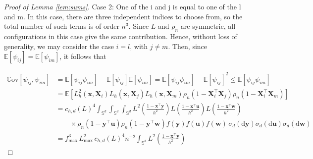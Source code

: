 \documentclass[12pt]{report} %
\newcommand{\bX}{\mathbf{X}}
\newcommand{\bx}{\mathbf{x}}
\newcommand{\by}{\mathbf{y}}
\newcommand{\bw}{\mathbf{w}}
\newcommand{\bu}{\boldsymbol{u}}
\newcommand{\sigmad}{\sigma_{d}}
\newcommand{\Sd}{\mathbb{S}^{d}}
\newcommand{\lc}{\left[}
\newcommand{\rc}{\right]}
\newcommand{\Cov}[2]{\mathbb{C}\mathrm{ov}\lc #1,#2\rc}
\begin{document}
\begin{proof}[Proof of Lemma \ref{lem:sums}]
Case 2: One of the i and j is equal to one of the l and m. In this case, there are three independent indices to choose from, so the total number of such terms is of order $n^3$. Since $L$ and $\rho_n$ are symmetric, all configurations in this case give the same contribution. Hence, without loss of generality, we may consider the case $i=l$, with $j\neq m$. Then, since $\mathbb{E}[\psi_{ij}] = \mathbb{E}[\psi_{im}]$, it follows that

\begin{align}
\Cov{\psi_{ij}}{\psi_{im}}
&= \mathbb{E}\!\left[\psi_{ij}\psi_{im}\right]
   - \mathbb{E}\!\left[\psi_{ij}\right]
     \mathbb{E}\!\left[\psi_{im}\right] 
= \mathbb{E}\!\left[\psi_{ij}\psi_{im}\right]
   - \mathbb{E}\!\left[\psi_{ij}\right]^2 
\leq \mathbb{E}\!\left[\psi_{ij}\psi_{im}\right] \nonumber \\
&= \mathbb{E}\!\left[
    L_h^2(\bx, \bX_i)
    L_h(\bx, \bX_j)
    L_h(\bx, \bX_m)
    \rho_n(1 - \bX_i^\top \bX_j)
    \rho_n(1 - \bX_i^\top \bX_m)
  \right] \nonumber \\
&= c_{h,d}(L)^4
  \int_{\Sd} \int_{\Sd} \int_{\Sd}
    L^2\!\left(\frac{1 - \bx^\top \by}{h^2}\right)
    L\!\left(\frac{1 - \bx^\top \bu}{h^2}\right)
    L\!\left(\frac{1 - \bx^\top \bw}{h^2}\right) \nonumber \\
&\qquad \times
    \rho_n(1 - \by^\top \bu)
    \rho_n(1 - \by^\top \bw)
    f(\by) f(\bu) f(\bw) \,
    \sigmad(\mathrm{d}\by)
    \sigmad(\mathrm{d}\bu)
    \sigmad(\mathrm{d}\bw) \nonumber \\
&= f_{\max}^3\, L_{\max}^2\, c_{h,d}(L)^4 n^{-2}
\int_{\Sd} L^2\!\left(\frac{1-\bx^\top\by}{h^2}\right)

\end{align}
\end{proof}
\end{document}
